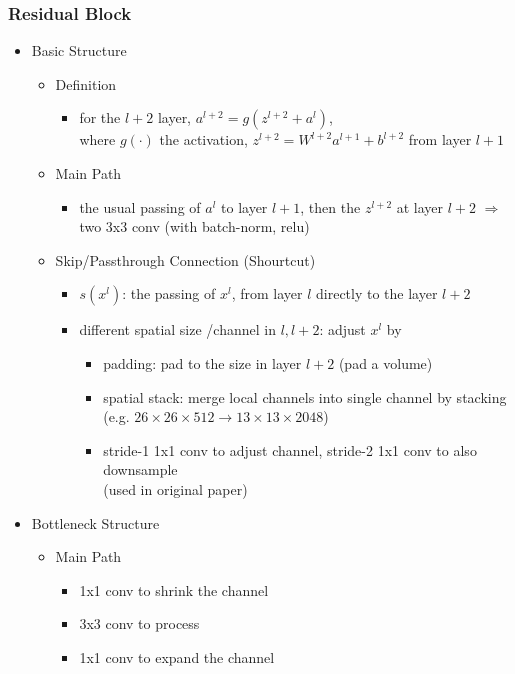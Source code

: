 \subsubsection{Residual Block} \label{DL_Block_Res}
\begin{itemize}
\item Basic Structure
	\begin{itemize}
	\item Definition
		\begin{itemize}
		\item for the $l+2$ layer, $a^{l+2} = g(z^{l+2} + a^l)$, \\
		where $g(\cdot)$ the activation, $z^{l+2} = W^{l+2}a^{l+1}+b^{l+2}$ from layer $l+1$ 
		\end{itemize}
	\item Main Path
		\begin{itemize}
		\item the usual passing of $a^l$ to layer $l+1$, then the $z^{l+2}$ at layer $l+2$
		$\Rightarrow$ two 3x3 conv (with batch-norm, relu)
		\end{itemize}
	\item Skip/Passthrough Connection (Shourtcut) \label{DL_Block_Res_Passthrough}
		\begin{itemize}
		\item $s(x^l)$: the passing of $x^{l}$, from layer $l$ directly to the layer $l+2$
		\item different spatial size /channel in $l, {l+2}$: adjust $x^l$ by
			\begin{itemize}
			\item padding: pad to the size in layer ${l+2}$ (pad a volume)
			\item spatial stack: merge local channels into single channel by stacking \\
			(e.g. $26\times26\times512\rightarrow13\times13\times2048$)
			\item stride-1 1x1 conv to adjust channel, stride-2 1x1 conv to also downsample \\
			(used in original paper)
			\end{itemize}
		\end{itemize}
	\end{itemize}

\item Bottleneck Structure
	\begin{itemize}
	\item Main Path
		\begin{itemize}
		\item 1x1 conv to shrink the channel
		\item 3x3 conv to process
		\item 1x1 conv to expand the channel
		\end{itemize}
	\end{itemize}


\end{itemize}
